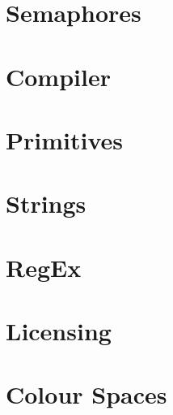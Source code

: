 

\section{Semaphores}\label{ref:app:semaphores}

\section{Compiler}\label{ref:app:compiler}

\section{Primitives}\label{ref:app:primitives}

\section{Strings}\label{ref:app:strings}

\section{RegEx}\label{ref:app:regex}

\section{Licensing}\label{ref:app:licensing}

\section{Colour Spaces}\label{ref:app:colour}